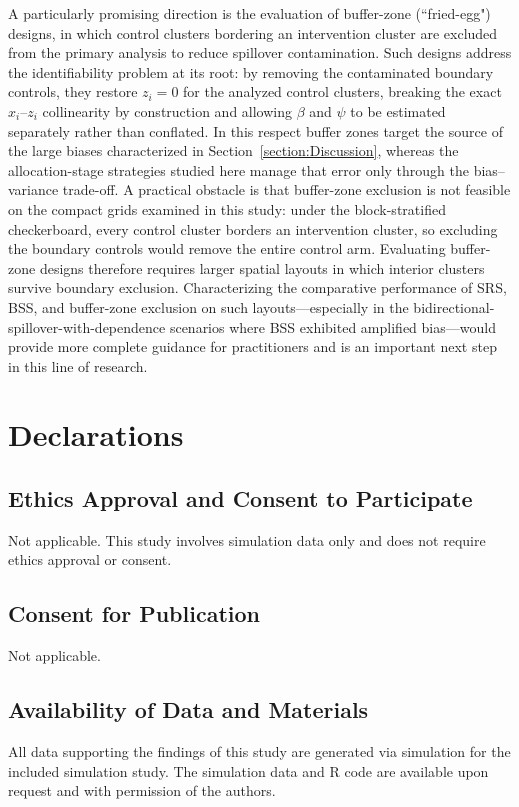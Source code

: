 \documentclass{article}[11pt]
\begin{document}
A particularly promising direction is the evaluation of buffer-zone (``fried-egg") designs, in which control clusters bordering an intervention cluster are excluded from the primary analysis to reduce spillover contamination\cite{jarvis_spatial_2017}. Such designs address the identifiability problem at its root: by removing the contaminated boundary controls, they restore $z_i = 0$ for the analyzed control clusters, breaking the exact $x_i$--$z_i$ collinearity by construction and allowing $\beta$ and $\psi$ to be estimated separately rather than conflated. In this respect buffer zones target the source of the large biases characterized in Section~\ref{section:Discussion}, whereas the allocation-stage strategies studied here manage that error only through the bias--variance trade-off. A practical obstacle is that buffer-zone exclusion is not feasible on the compact grids examined in this study: under the block-stratified checkerboard, every control cluster borders an intervention cluster, so excluding the boundary controls would remove the entire control arm. Evaluating buffer-zone designs therefore requires larger spatial layouts in which interior clusters survive boundary exclusion. Characterizing the comparative performance of SRS, BSS, and buffer-zone exclusion on such layouts---especially in the bidirectional-spillover-with-dependence scenarios where BSS exhibited amplified bias---would provide more complete guidance for practitioners and is an important next step in this line of research.

\section*{Declarations}

\subsection*{Ethics Approval and Consent to Participate}
Not applicable. This study involves simulation data only and does not require ethics approval or consent.

\subsection*{Consent for Publication}
Not applicable.

\subsection*{Availability of Data and Materials}
All data supporting the findings of this study are generated via simulation for the included simulation study. The simulation data and R code are available upon request and with permission of the authors.
\end{document}
